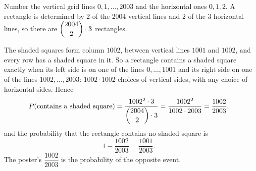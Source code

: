 Number the vertical grid lines $0,1,\dots,2003$ and the horizontal ones $0,1,2$. A rectangle is determined by $2$ of the $2004$ vertical lines and $2$ of the $3$ horizontal lines, so there are $\dbinom{2004}{2}\cdot3$ rectangles.

The shaded squares form column $1002$, between vertical lines $1001$ and $1002$, and every row has a shaded square in it. So a rectangle contains a shaded square exactly when its left side is on one of the lines $0,\dots,1001$ and its right side on one of the lines $1002,\dots,2003$: $1002\cdot1002$ choices of vertical sides, with any choice of horizontal sides. Hence
\[
P(\text{contains a shaded square})=\dfrac{1002^2\cdot3}{\dbinom{2004}{2}\cdot3}=\dfrac{1002^2}{1002\cdot2003}=\dfrac{1002}{2003},
\]
and the probability that the rectangle contains no shaded square is
\[
1-\dfrac{1002}{2003}=\boxed{\dfrac{1001}{2003}} .
\]
The poster's $\dfrac{1002}{2003}$ is the probability of the opposite event.
